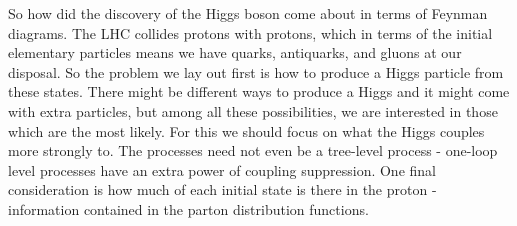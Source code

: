 \documentclass[a4paper, 11pt, normalem]{report}
\begin{document}
So how did the discovery of the Higgs boson come about in terms of Feynman diagrams.
The LHC collides protons with protons, which in terms of the initial elementary particles means we have quarks, antiquarks, and gluons at our disposal.
So the problem we lay out first is how to produce a Higgs particle from these states.
There might be different ways to produce a Higgs and it might come with extra particles, but among all these possibilities, we are interested in those which are the most likely.
For this we should focus on what the Higgs couples more strongly to.
The processes need not even be a tree-level process - one-loop level processes have an extra power of coupling suppression.
One final consideration is how much of each initial state is there in the proton - information contained in the parton distribution functions.
\end{document}
